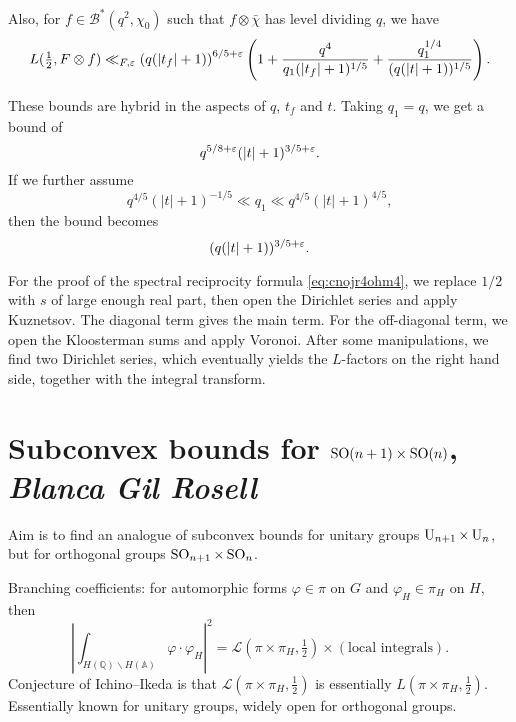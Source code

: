 \documentclass[reqno]{amsart} 
\begin{document}
Also, for $f \in \mathcal{B}^\ast(q^2, \chi_0)$ such that $f \otimes \bar{\chi}$ has level dividing $q$, we have
\begin{equation*}
  L(\tfrac{1}{2}, F \otimes f)
  \ll_{F, \varepsilon}
  \left( q(\lvert t_f \rvert + 1) \right)^{6/5 + \varepsilon}
  \left( 1 + \frac{q^4}{q_1(\lvert t_f \rvert + 1)^{1/5}}
    + \frac{q_1^{1/4}}{(q(\lvert t \rvert + 1))^{1/5}}\right).
\end{equation*}

These bounds are hybrid in the aspects of $q$, $t_f$ and $t$.  Taking $q_1 = q$, we get a bound of
\begin{equation*}
  q^{5/8 + \varepsilon}(\lvert t \rvert + 1)^{3/5 + \varepsilon}.
\end{equation*}
If we further assume
\begin{equation*}
  q^{4/5}(\lvert t \rvert + 1)^{- 1/5} \ll q_1 \ll q^{4/5}(\lvert t \rvert + 1)^{4/5},
\end{equation*}
then the bound becomes
\begin{equation*}
  (q(\lvert t \rvert + 1))^{3/5 + \varepsilon}.
\end{equation*}

For the proof of the spectral reciprocity formula \ref{eq:cnojr4ohm4}, we replace $1/2$ with $s$ of large enough real part, then open the Dirichlet series and apply Kuznetsov.  The diagonal term gives the main term.  For the off-diagonal term, we open the Kloosterman sums and apply Voronoi.  After some manipulations, we find two Dirichlet series, which eventually yields the $L$-factors on the right hand side, together with the integral transform.

\section{Subconvex bounds for $\operatorname{SO}(n+1) \times \operatorname{SO}(n)$, \textnormal{\emph{Blanca Gil Rosell}}}
Aim is to find an analogue of subconvex bounds for unitary groups $\operatorname{U}_{n + 1} \times \operatorname{U}_n$, but for orthogonal groups $\operatorname{SO}_{n + 1} \times \operatorname{SO}_n$.

Branching coefficients: for automorphic forms $\varphi \in \pi$ on $G$ and $\varphi_H \in \pi_H$ on $H$, then
\begin{equation*}
  \left| \int_{H(\mathbb{Q}) \backslash H(\mathbb{A})}
    \varphi \cdot \varphi_H\right|^2
  = \mathcal{L}(\pi \times \pi_H, \tfrac{1}{2}) \times (\text{local integrals}).
\end{equation*}
Conjecture of Ichino--Ikeda is that $\mathcal{L}(\pi \times \pi_H, \tfrac{1}{2})$ is essentially $L(\pi \times \pi_H, \tfrac{1}{2})$.  Essentially known for unitary groups, widely open for orthogonal groups.
\end{document}
